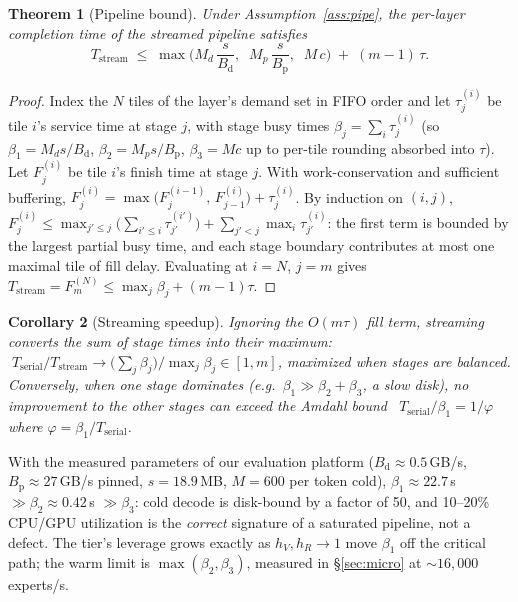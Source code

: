 \documentclass[11pt]{article}
\newtheorem{theorem}{Theorem}[section]
\newtheorem{corollary}[theorem]{Corollary}
\theoremstyle{definition}
\theoremstyle{remark}
\newcommand{\bd}{B_{\mathrm{d}}}
\newcommand{\bp}{B_{\mathrm{p}}}
\begin{document}
\begin{theorem}[Pipeline bound]\label{thm:pipe}
Under Assumption~\ref{ass:pipe}, the per-layer completion time of the
streamed pipeline satisfies
\begin{equation}
T_{\mathrm{stream}} \;\le\;
\max\!\Big( M_d\,\frac{s}{\bd},\;\; M_p\,\frac{s}{\bp},\;\; M\,c \Big)
\;+\; (m-1)\,\tau .
\end{equation}
\end{theorem}
\begin{proof}
Index the $N$ tiles of the layer's demand set in FIFO order and let
$\tau_j^{(i)}$ be tile $i$'s service time at stage $j$, with stage busy
times $\beta_j=\sum_i \tau_j^{(i)}$ (so $\beta_1 = M_d s/\bd$, $\beta_2 =
M_p s/\bp$, $\beta_3 = M c$ up to per-tile rounding absorbed into $\tau$).
Let $F_j^{(i)}$ be tile $i$'s finish time at stage $j$. With
work-conservation and sufficient buffering,
$F_j^{(i)} = \max\big(F_j^{(i-1)},\, F_{j-1}^{(i)}\big) + \tau_j^{(i)}$.
By induction on $(i,j)$,
$F_j^{(i)} \le \max_{j'\le j}\big(\sum_{i'\le i}\tau_{j'}^{(i')}\big)
+ \sum_{j'<j}\max_i \tau_{j'}^{(i)}$:
the first term is bounded by the largest partial busy time, and each stage
boundary contributes at most one maximal tile of fill delay. Evaluating at
$i=N$, $j=m$ gives
$T_{\mathrm{stream}} = F_m^{(N)} \le \max_j \beta_j + (m-1)\tau$.
\end{proof}

\begin{corollary}[Streaming speedup]\label{cor:speedup}
Ignoring the $O(m\tau)$ fill term, streaming converts the sum of stage times
into their maximum:
$\;T_{\mathrm{serial}}/T_{\mathrm{stream}} \to
\big(\sum_j \beta_j\big)/\max_j \beta_j \in [1, m]$,
maximized when stages are balanced. Conversely, when one stage dominates
(e.g.\ $\beta_1 \gg \beta_2 + \beta_3$, a slow disk), \emph{no} improvement
to the other stages can exceed the Amdahl bound~\citep{amdahl1967validity}
$T_{\mathrm{serial}}/\beta_1 = 1/\varphi$ where $\varphi = \beta_1 /
T_{\mathrm{serial}}$.
\end{corollary}

With the measured parameters of our evaluation platform ($\bd \approx
0.5$\,GB/s, $\bp \approx 27$\,GB/s pinned, $s=18.9$\,MB, $M=600$ per token
cold), $\beta_1 \approx 22.7$\,s $\gg \beta_2 \approx 0.42$\,s $\gg \beta_3$:
cold decode is disk-bound by a factor of 50, and 10--20\% CPU/GPU utilization
is the \emph{correct} signature of a saturated pipeline, not a defect.
The tier's leverage grows exactly as $h_V, h_R \to 1$ move $\beta_1$ off the
critical path; the warm limit is $\max(\beta_2,\beta_3)$, measured in
\S\ref{sec:micro} at ${\sim}16{,}000$ experts/s.
\end{document}
